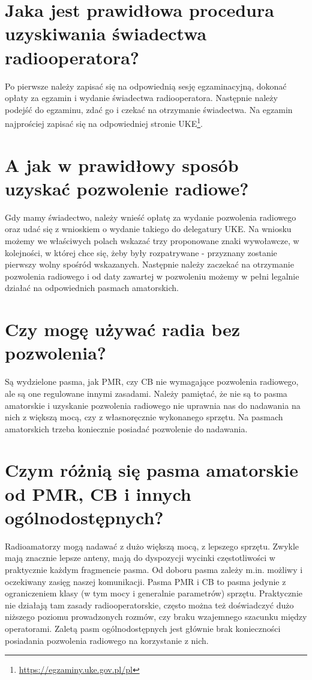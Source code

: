 \documentclass[a4paper,12pt]{article}
\begin{document}
\section{Jaka jest prawidłowa procedura uzyskiwania świadectwa radiooperatora?}
Po pierwsze należy zapisać się na odpowiednią sesję egzaminacyjną, dokonać opłaty za egzamin i wydanie świadectwa radiooperatora. Następnie należy podejść do egzaminu, zdać go i czekać na otrzymanie świadectwa. Na egzamin najprościej zapisać się na odpowiedniej stronie UKE\footnote{\url{https://egzaminy.uke.gov.pl/pl}}. 

\section{A jak w prawidłowy sposób uzyskać pozwolenie radiowe?}
Gdy mamy świadectwo, należy wnieść opłatę za wydanie pozwolenia radiowego oraz udać się z wnioskiem o wydanie takiego do delegatury UKE. Na wniosku możemy we właściwych polach wskazać trzy proponowane znaki wywoławcze, w kolejności, w której chce się, żeby były rozpatrywane - przyznany zostanie pierwszy wolny spośród wskazanych. Następnie należy zaczekać na otrzymanie pozwolenia radiowego i od daty zawartej w pozwoleniu możemy w pełni legalnie działać na odpowiednich pasmach amatorskich.

\section{Czy mogę używać radia bez pozwolenia?}
Są wydzielone pasma, jak PMR, czy CB nie wymagające pozwolenia radiowego, ale są one regulowane innymi zasadami. Należy pamiętać, że nie są to pasma amatorskie i uzyskanie pozwolenia radiowego nie uprawnia nas do nadawania na nich z większą mocą, czy z własnoręcznie wykonanego sprzętu. Na pasmach amatorskich trzeba koniecznie posiadać pozwolenie do nadawania.

\section{Czym różnią się pasma amatorskie od PMR, CB i innych ogólnodostępnych?}
Radioamatorzy mogą nadawać z dużo większą mocą, z lepszego sprzętu. Zwykle mają znacznie lepsze anteny, mają do dyspozycji wycinki częstotliwości w praktycznie każdym fragmencie pasma.
Od doboru pasma zależy m.in. możliwy i oczekiwany zasięg naszej komunikacji. Pasma PMR i CB to pasma jedynie z ograniczeniem klasy (w tym mocy i generalnie parametrów) sprzętu. Praktycznie nie działają tam zasady radiooperatorskie, często można też doświadczyć dużo niższego poziomu prowadzonych rozmów, czy braku wzajemnego szacunku między operatorami. Zaletą pasm ogólnodostępnych jest głównie brak konieczności posiadania pozwolenia radiowego na korzystanie z nich.
\end{document}
